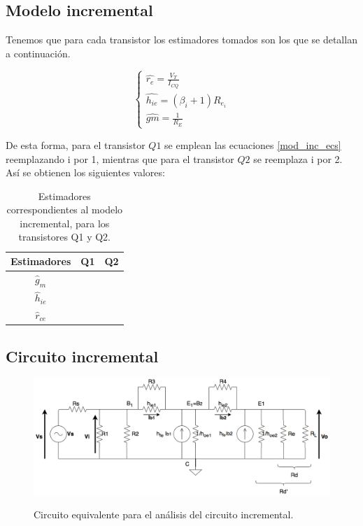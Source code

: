 	\subsection{Modelo incremental}
	
	Tenemos que para cada transistor los estimadores tomados son los que se detallan a continuación.


		\begin{equation}
			\begin{cases}
			\widehat{r_{e}}=\frac{V_{T}}{I_{CQ}}\\
			\widehat{h_{ie}}=(\beta_{i}+1)R_{e_{i}}\\	
			\widehat{gm}=\frac{1}{R_{E}}
			\end{cases}
			\label{mod_inc_ecs}
		\end{equation}
	
	De esta forma, para el transistor $Q1$ se emplean las ecuaciones \ref{mod_inc_ecs} reemplazando i por 1, mientras que para el transistor $Q2$ se reemplaza i por 2. Así se obtienen los siguientes valores:
	
	\begin{table}[h!]
		\centering
		\begin{tabular}{c c c}%
			\bfseries Estimadores & Q1 & Q2 \\ \hline
			$\widehat{g}_m$ &  & \\
			$\widehat{h}_{ie}$ &  & \\
			$\widehat{r}_{ce}$&  & \\
			\hline
		\end{tabular}
		\caption{Estimadores correspondientes al modelo incremental, para los transistores Q1 y Q2.}
		\label{avolf}
	\end{table}
	
	\subsection{Circuito incremental}
	
		
		\begin{figure}[H]
			\centering
			\includegraphics[scale=0.4]{./Imagenes/circ_incremental.png} \\
			\caption{Circuito equivalente para el an\'alisis del circuito incremental.}
			\label{circ_incremental}
		\end{figure}

